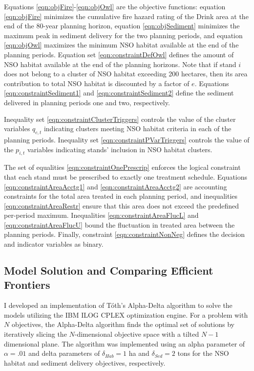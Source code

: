 Equations \eqref{eqn:objFire}-\eqref{eqn:objOwl} are the objective functions: equation \eqref{eqn:objFire} minimizes the cumulative fire hazard rating of the Drink area at the end of the 80-year planning horizon, equation \eqref{eqn:objSediment} minimizes the maximum peak in sediment delivery for the two planning periods, and equation \eqref{eqn:objOwl} maximizes the minimum NSO habitat available at the end of the planning periods. Equation set \eqref{eqn:constraintDefOwl} defines the amount of NSO habitat available at the end of the planning horizons. Note that if stand $i$ does not belong to a cluster of NSO habitat exceeding 200 hectares, then its area contribution to total NSO habitat is discounted by a factor of $e$. Equations \eqref{eqn:constraintSediment1} and \eqref{eqn:constraintSediment2} define the sediment delivered in planning periods one and two, respectively.

Inequality set \eqref{eqn:constraintClusterTriggers} controls the value of the cluster variables $q_{c,t}$ indicating clusters meeting NSO habitat criteria in each of the planning periods. Inequality set \eqref{eqn:constraintPVarTriggers} controls the value of the $p_{i,t}$ variables indicating stands' inclusion in NSO habitat clusters.

The set of equalities \eqref{eqn:constraintOnePrescrip} enforces the logical constraint that each stand must be prescribed to exactly one treatment schedule. Equations \eqref{eqn:constraintAreaAcctg1} and \eqref{eqn:constraintAreaAcctg2} are accounting constraints for the total area treated in each planning period, and inequalities \eqref{eqn:constraintAreaRestr} ensure that this area does not exceed the predefined per-period maximum. Inequalities \eqref{eqn:constraintAreaFlucL} and \eqref{eqn:constraintAreaFlucU} bound the fluctuation in treated area between the planning periods. Finally, constraint \eqref{eqn:constraintNonNeg} defines the decision and indicator variables as binary.

\subsection{Model Solution and Comparing Efficient Frontiers}
I developed an implementation of T\'{o}th's Alpha-Delta algorithm \cite{TothThesis} to solve the models utilizing the IBM ILOG CPLEX optimization engine. For a problem with $N$ objectives, the Alpha-Delta algorithm finds the optimal set of solutions by iteratively slicing the $N$-dimensional objective space with a tilted $N-1$ dimensional plane. The algorithm was implemented using an alpha parameter of $\alpha = .01$ and delta parameters of $\delta_{Hab} = 1$ ha and $\delta_{Sed} = 2$ tons for the NSO habitat and sediment delivery objectives, respectively.

